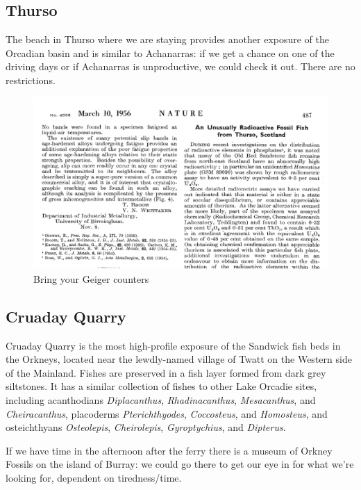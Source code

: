 \documentclass[12pt,letterpaper]{article}
\begin{document}
\subsection{Thurso}

The beach in Thurso where we are staying provides another exposure of the Orcadian basin and is similar to Achanarras: if we get a chance on one of the driving days or if Achanarras is unproductive, we could check it out.  There are no restrictions.

\begin{figure}[h!]
\caption{Bring your Geiger counters}
\includegraphics[scale=0.5]{Radioactive_fish}
\centering
\end{figure}

\subsection{Cruaday Quarry}

Cruaday Quarry is the most high-profile exposure of the Sandwick fish beds in the Orkneys, located near the lewdly-named village of Twatt on the Western side of the Mainland.  Fishes are preserved in a fish layer formed from dark grey siltstones. It has a similar collection of fishes to other Lake Orcadie sites, including acanthodians \textit{Diplacanthus}, \textit{Rhadinacanthus}, \textit{Mesacanthus}, and \textit{Cheiracanthus}, placoderms \textit{Pterichthyodes}, \textit{Coccosteus}, and \textit{Homosteus}, and osteichthyans \textit{Osteolepis}, \textit{Cheirolepis}, \textit{Gyroptychius}, and \textit{Dipterus}.

If we have time in the afternoon after the ferry there is a museum of Orkney Fossils on the island of Burray: we could go there to get our eye in for what we're looking for, dependent on tiredness/time.
\end{document}

